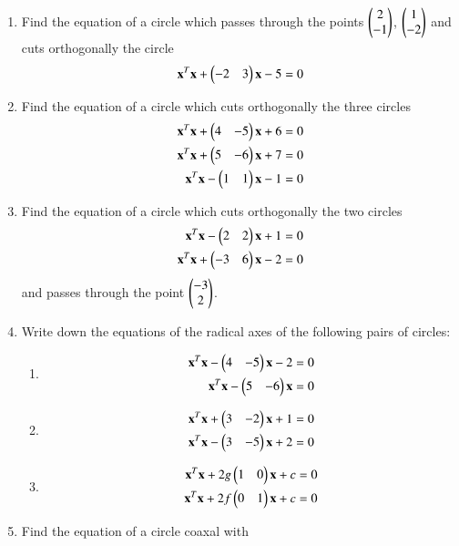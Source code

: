 \renewcommand{\theequation}{\theenumi}
\begin{enumerate}[label=\arabic*.,ref=\thesubsection.\theenumi]
\item Find the equation of a circle which passes through the points $\begin{pmatrix}2\\-1\end{pmatrix}$, $\begin{pmatrix}1\\-2\end{pmatrix}$ and cuts orthogonally the circle
\begin{align}
\mathbf{x}^T\mathbf{x}+\begin{pmatrix}-2 & 3\end{pmatrix}\mathbf{x}-5 = 0
\end{align}
\item Find the equation of a circle which cuts orthogonally the three circles
\begin{align}
\mathbf{x}^T\mathbf{x}+\begin{pmatrix}4 & -5\end{pmatrix}\mathbf{x}+6 = 0
\\
\mathbf{x}^T\mathbf{x}+\begin{pmatrix}5 & -6\end{pmatrix}\mathbf{x}+7 = 0
\\
\mathbf{x}^T\mathbf{x}-\begin{pmatrix}1 & 1\end{pmatrix}\mathbf{x}-1 = 0
\end{align}
\item Find the equation of a circle which cuts orthogonally the two circles
\begin{align}
\mathbf{x}^T\mathbf{x}-\begin{pmatrix}2 & 2\end{pmatrix}\mathbf{x}+1 = 0
\\
\mathbf{x}^T\mathbf{x}+\begin{pmatrix}-3 & 6\end{pmatrix}\mathbf{x}-2 = 0
\end{align}
and passes through the point $\begin{pmatrix}-3\\2\end{pmatrix}$.
\item Write down the equations of the radical axes of the following pairs of circles:
\begin{enumerate}
\item
%
\begin{align}
\mathbf{x}^T\mathbf{x}-\begin{pmatrix}4 & -5\end{pmatrix}\mathbf{x}-2 = 0
\\
\mathbf{x}^T\mathbf{x}-\begin{pmatrix}5 & -6\end{pmatrix}\mathbf{x} = 0
\end{align}
%
\item
\begin{align}
%
\vec{x}^T\vec{x}+\myvec{3 & -2}\vec{x}+1 = 0
\\
\vec{x}^T\vec{x}-\myvec{3 & -5}\vec{x}+2 = 0
\end{align}
%
\item
\begin{align}
%
\vec{x}^T\vec{x}+2g\myvec{1 & 0}\vec{x}+c = 0
\\
\vec{x}^T\vec{x}+2f\myvec{0 & 1}\vec{x}+c = 0
\end{align}
%
\end{enumerate}
\item Find the equation of a circle coaxal with

\end{enumerate}

